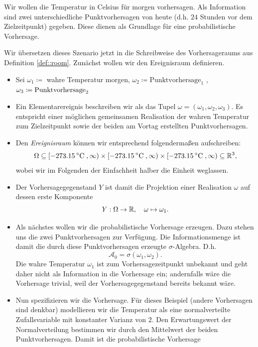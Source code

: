 \begin{bsp}[Vorhersageraum]\label{bsp::Room}
Wir wollen die Temperatur in Celsius für morgen vorhersagen. Als Information sind zwei unterschiedliche Punktvorhersagen von heute (d.h. $24$ Stunden vor dem Zielzeitpunkt) gegeben. Diese dienen als Grundlage für eine probabilistische Vorhersage.

Wir übersetzen dieses Szenario jetzt in die Schreibweise des Vorhersageraums aus Definition \ref{def::room}. Zunächst wollen wir den Ereignisraum definieren.

\begin{itemize}
    \item Sei $\omega_1 \coloneqq$ wahre Temperatur morgen, $\omega_2 \coloneqq  \text{Punktvorhersage}_1$ , $\omega_3 \coloneqq \text{Punkt\-vorhersage}_2$
    \item Ein Elementarereignis beschreiben wir als das Tupel $\omega = (\omega_1, \omega_2, \omega_3)$. Es entspricht einer möglichen gemeinsamen Realisation der wahren Temperatur zum Zielzeitpunkt sowie der beiden am Vortag erstellten Punktvorhersagen.
    \item Den \emph{Ereignisraum} können wir entsprechend folgendermaßen aufschreiben: 
    \[
    \Omega \subseteq [-273.15\,^\circ\mathrm{C} \;, \infty) \times [-273.15\,^\circ\mathrm{C} \; ,\infty) \times [-273.15\,^\circ\mathrm{C} \; ,\infty) \subseteq \mathbb{R}^3,
    \] 
    wobei wir im Folgenden der Einfachheit halber die Einheit weglassen.
    \item Der Vorhersagegegenstand $Y$ ist damit die Projektion einer Realisation $\omega$ auf dessen erste Komponente
    \[
    Y: \Omega \to \mathbb{R}, \quad \omega \mapsto \omega_1. 
    \]
    \item Als nächstes wollen wir die probabilistische Vorhersage erzeugen. Dazu stehen uns die zwei Punktvorhersagen zur Verfügung. Die Informationsmenge ist damit die durch diese Punktvorhersagen erzeugte $\sigma$-Algebra. D.h.
    \[
    \mathcal A_0=\sigma(\omega_1,\omega_2).
    \]
    Die wahre Temperatur $\omega_1$ ist zum Vorhersagezeitpunkt unbekannt und geht daher nicht als Information in die Vorhersage ein; andernfalls wäre die Vorhersage trivial, weil der Vorhersagegegenstand bereits bekannt wäre.
    \item Nun spezifizieren wir die Vorhersage. Für dieses Beispiel (andere Vorhersagen sind denkbar) modellieren wir die Temperatur als eine normalverteilte Zufallsvariable mit konstanter Varianz von $2$. Den Erwartungswert der Normalverteilung bestimmen wir durch den Mittelwert der beiden Punktvorhersagen. Damit ist die probabilistische Vorhersage 

\end{itemize}
\end{bsp}

